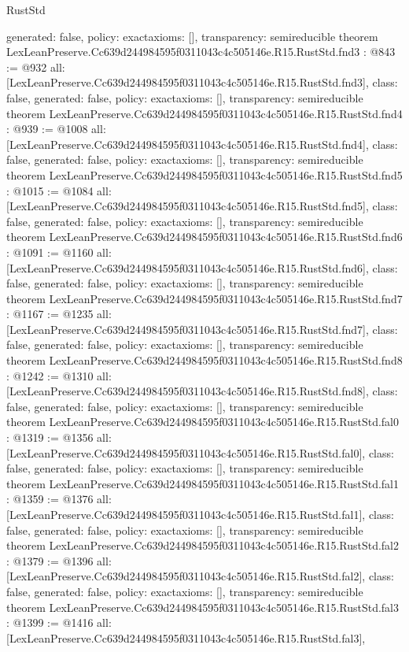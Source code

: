 \begin{lexlean}{RustStd}
\begin{coremodule}
{  generated: false,
  policy: exact{axioms: []},
  transparency: semireducible
}
theorem LexLeanPreserve.Cc639d244984595f0311043c4c505146e.R15.RustStd.fnd3 : @843 := @932 {
  all: [LexLeanPreserve.Cc639d244984595f0311043c4c505146e.R15.RustStd.fnd3],
  class: false,
  generated: false,
  policy: exact{axioms: []},
  transparency: semireducible
}
theorem LexLeanPreserve.Cc639d244984595f0311043c4c505146e.R15.RustStd.fnd4 : @939 := @1008 {
  all: [LexLeanPreserve.Cc639d244984595f0311043c4c505146e.R15.RustStd.fnd4],
  class: false,
  generated: false,
  policy: exact{axioms: []},
  transparency: semireducible
}
theorem LexLeanPreserve.Cc639d244984595f0311043c4c505146e.R15.RustStd.fnd5 : @1015 := @1084 {
  all: [LexLeanPreserve.Cc639d244984595f0311043c4c505146e.R15.RustStd.fnd5],
  class: false,
  generated: false,
  policy: exact{axioms: []},
  transparency: semireducible
}
theorem LexLeanPreserve.Cc639d244984595f0311043c4c505146e.R15.RustStd.fnd6 : @1091 := @1160 {
  all: [LexLeanPreserve.Cc639d244984595f0311043c4c505146e.R15.RustStd.fnd6],
  class: false,
  generated: false,
  policy: exact{axioms: []},
  transparency: semireducible
}
theorem LexLeanPreserve.Cc639d244984595f0311043c4c505146e.R15.RustStd.fnd7 : @1167 := @1235 {
  all: [LexLeanPreserve.Cc639d244984595f0311043c4c505146e.R15.RustStd.fnd7],
  class: false,
  generated: false,
  policy: exact{axioms: []},
  transparency: semireducible
}
theorem LexLeanPreserve.Cc639d244984595f0311043c4c505146e.R15.RustStd.fnd8 : @1242 := @1310 {
  all: [LexLeanPreserve.Cc639d244984595f0311043c4c505146e.R15.RustStd.fnd8],
  class: false,
  generated: false,
  policy: exact{axioms: []},
  transparency: semireducible
}
theorem LexLeanPreserve.Cc639d244984595f0311043c4c505146e.R15.RustStd.fal0 : @1319 := @1356 {
  all: [LexLeanPreserve.Cc639d244984595f0311043c4c505146e.R15.RustStd.fal0],
  class: false,
  generated: false,
  policy: exact{axioms: []},
  transparency: semireducible
}
theorem LexLeanPreserve.Cc639d244984595f0311043c4c505146e.R15.RustStd.fal1 : @1359 := @1376 {
  all: [LexLeanPreserve.Cc639d244984595f0311043c4c505146e.R15.RustStd.fal1],
  class: false,
  generated: false,
  policy: exact{axioms: []},
  transparency: semireducible
}
theorem LexLeanPreserve.Cc639d244984595f0311043c4c505146e.R15.RustStd.fal2 : @1379 := @1396 {
  all: [LexLeanPreserve.Cc639d244984595f0311043c4c505146e.R15.RustStd.fal2],
  class: false,
  generated: false,
  policy: exact{axioms: []},
  transparency: semireducible
}
theorem LexLeanPreserve.Cc639d244984595f0311043c4c505146e.R15.RustStd.fal3 : @1399 := @1416 {
  all: [LexLeanPreserve.Cc639d244984595f0311043c4c505146e.R15.RustStd.fal3],
}
\end{coremodule}
\end{lexlean}
